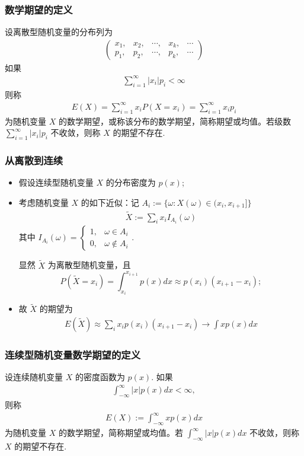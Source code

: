 \documentclass[Prob-All.tex]{subfiles}
\begin{document}
\begin{frame}
	\frametitle{数学期望的定义}
	\begin{defi}
		设离散型随机变量的分布列为 \begin{eqnarray*}
			\left(\begin{array}{ccccc}
				x_1,&x_2, &\cdots, &x_k, &\cdots\\
				p_1,&p_2, &\cdots, &p_k, &\cdots
			\end{array}\right)
		\end{eqnarray*}
		如果
		\begin{eqnarray*}
			\sum_{i=1}^\infty|x_i|p_i<\infty
		\end{eqnarray*}
		则称
		\begin{eqnarray*}
			E(X)=\sum_{i=1}^\infty x_iP(X=x_i)=\sum_{i=1}^\infty x_ip_i
		\end{eqnarray*}
		为随机变量 $X$ 的数学期望，或称该分布的数学期望，简称期望或均值。若级数 $\sum_{i=1}^\infty|x_i|p_i$ 不收敛，则称 $X$ 的期望不存在.
	\end{defi}
\end{frame}
\begin{frame}
	\frametitle{从离散到连续}
	\begin{itemize}[<+-|alert@+>]
		\item 假设连续型随机变量 $X$ 的分布密度为 $p (x)$;
		\item 考虑随机变量 $X$ 的如下近似：记 $A_i:=\{\omega:X (\omega)\in (x_i, x_{i+1}]\}$
		\begin{eqnarray*}
			\tilde{X}:=\sum_{i}x_iI_{A_i}(\omega)
		\end{eqnarray*} 其中 $I_{A_i}(\omega)=\left\{
		\begin{array}{ll}
			1,& \omega\in A_i\\
			0,& \omega\notin A_i
		\end{array}\right.
		$.

		显然 $\tilde{X}$ 为离散型随机变量，且
		\[P(\tilde{X}=x_i)=\int_{x_i}^{x_{i+1}}p(x)dx\approx p(x_i)(x_{i+1}-x_i);\]
		\item 故 $\tilde{X}$ 的期望为
		\begin{eqnarray*}
			E(\tilde{X})\approx \sum_i x_ip(x_i)(x_{i+1}-x_i)\rightarrow \int xp(x)dx
		\end{eqnarray*}

	\end{itemize}
\end{frame}

\begin{frame}
	\frametitle{连续型随机变量数学期望的定义}
	\begin{defi}
		设连续随机变量 $X$ 的密度函数为 $p (x)$. 如果
		\begin{eqnarray*}
			\int_{-\infty}^{\infty}|x|p(x)dx<\infty,
		\end{eqnarray*}
		则称
		\begin{eqnarray*}
			E(X):=\int_{-\infty}^\infty xp(x)dx
		\end{eqnarray*}
		为随机变量 $X$ 的数学期望，简称期望或均值。若 $\int_{-\infty}^\infty|x|p (x) dx$ 不收敛，则称 $X$ 的期望不存在.
	\end{defi}
\end{frame}
\end{document}
